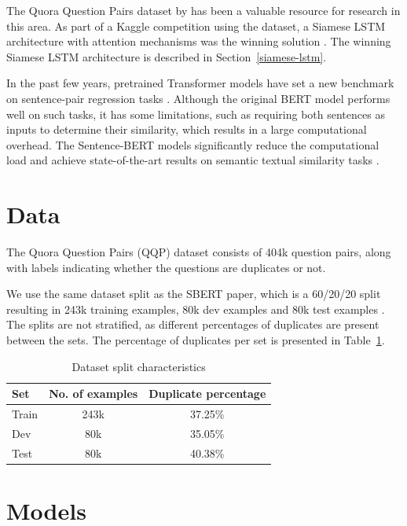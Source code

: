 \documentclass[10pt, a4paper]{article}
\begin{document}
The Quora Question Pairs dataset by \citet{iyer2017first} has been a valuable resource for research in this area.
As part of a Kaggle competition using the dataset, a Siamese LSTM architecture with attention mechanisms was the winning solution \citep{dadashov2017quora}.
The winning Siamese LSTM architecture is described in Section~\ref{siamese-lstm}.

In the past few years, pretrained Transformer models have set a new benchmark on sentence-pair regression tasks \citep{devlin2018bert}.
Although the original BERT model performs well on such tasks, it has some limitations, such as requiring both sentences as inputs to determine their similarity, which results in a large computational overhead.
The Sentence-BERT models significantly reduce the computational load and achieve state-of-the-art results on semantic textual similarity tasks \citep{reimers-2019-sentence-bert}.

\section{Data} \label{dataset}

The Quora Question Pairs (QQP) dataset consists of 404k question pairs, along with labels indicating whether the questions are duplicates or not.

We use the same dataset split as the SBERT paper, which is a 60/20/20 split resulting in 243k training examples, 80k dev examples and 80k test examples \citep{reimers-2019-sentence-bert}.
The splits are not stratified, as different percentages of duplicates are present between the sets. The percentage of duplicates per set is presented in Table~\ref{tab:duplicate-percentages}.

\begin{table}
\caption{Dataset split characteristics}
\label{tab:duplicate-percentages}
\begin{center}
\begin{tabular}{lcc}
\toprule
\textbf{Set} & \textbf{No. of examples} & \textbf{Duplicate percentage} \\
\midrule
Train & 243k & 37.25\% \\
Dev   & 80k  & 35.05\% \\
Test  & 80k  & 40.38\% \\
\bottomrule
\end{tabular}
\end{center}
\end{table}

\section{Models} \label{models}
\end{document}
